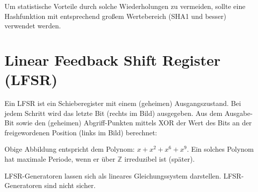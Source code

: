 Um statistische Vorteile durch solche Wiederholungen zu vermeiden, sollte eine Hashfunktion mit entsprechend großem Wertebereich (SHA1 und besser) verwendet werden.


\section{Linear Feedback Shift Register (LFSR)}

Ein LFSR ist ein Schieberegister mit einem (geheimen) Ausgangszustand. Bei jedem Schritt wird das letzte Bit (rechts im Bild) ausgegeben. Aus dem Ausgabe-Bit sowie den (geheimen) Abgriff-Punkten mittels XOR der Wert des Bits an der freigewordenen Position (links im Bild) berechnet:

\begin{center}
\def\svgwidth{0.5\columnwidth}

\end{center}


Obige Abbildung entspricht dem Polynom: $x+x^2+x^6+x^9$. Ein solches Polynom hat maximale Periode, wenn er über $\mathbb{Z}$ irreduzibel ist (später).

LFSR-Generatoren lassen sich als lineares Gleichungssystem darstellen. LFSR-Generatoren sind nicht sicher.

